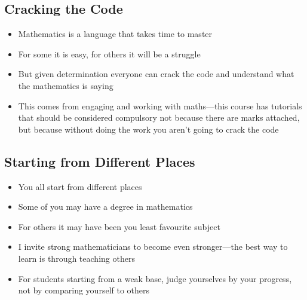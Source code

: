 
\begin{slide}
\section{Cracking the Code}

\begin{PauseHighLight}
  \begin{itemize}
  \item Mathematics is a language that takes time to master\pause
  \item For some it is easy, for others it will be a struggle\pause
  \item But given determination everyone can crack the code and
    understand what the mathematics is saying\pause
  \item This comes from engaging and working with maths\pause---this course has
    tutorials that should be considered compulsory\pauseb{} not because
    there are marks attached, but because without doing the work you
    aren't going to crack the code\pauseb
  \end{itemize}
\end{PauseHighLight}

\end{slide}


\begin{slide}
\section{Starting from Different Places}

\begin{PauseHighLight}
  \begin{itemize}
  \item You all start from different places\pause
  \item Some of you may have a degree in mathematics\pause
  \item For others it may have been you least favourite subject\pause
  \item I invite strong mathematicians to become even
    stronger\pause---the best way to learn is through teaching
    others\pauseb
  \item For students starting from a weak base, judge yourselves by
    your progress, not by comparing yourself to others\pause
  \end{itemize}
\end{PauseHighLight}

\end{slide}

